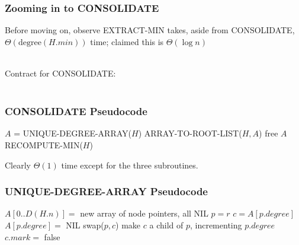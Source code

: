 \documentclass{beamer}
\newcommand{\stanza}{ \\~\ }
\begin{document}
\begin{frame} \frametitle{Zooming in to CONSOLIDATE}
Before moving on, observe EXTRACT-MIN takes, aside from CONSOLIDATE,
$\Theta(\text{degree}(H.min))$ time; claimed this is $\Theta(\log n)$
\stanza

Contract for CONSOLIDATE: \stanza

\begin{algorithmic}[1]
  \EndFunction
\end{algorithmic}
\end{frame}

\begin{frame} \frametitle{CONSOLIDATE Pseudocode}
  \begin{algorithmic}[1]
    \State $A$ = UNIQUE-DEGREE-ARRAY($H$)
    \State ARRAY-TO-ROOT-LIST($H, A$)
    \State free $A$
    \State RECOMPUTE-MIN($H$)
    \EndFunction
  \end{algorithmic}
  \vspace{.5cm}
  Clearly $\Theta(1)$ time except for the three subroutines.
\end{frame}

\begin{frame} \frametitle{UNIQUE-DEGREE-ARRAY Pseudocode}
  {\small
  \begin{algorithmic}[1]
    \State $A[0..D(H.n)] = $ new array of node pointers, all NIL
     
      \State $p = r$ 
       
        \State $c = A[p.degree]$ 
        \State $A[p.degree] = $ NIL 
          \State swap($p, c$) 
        \EndIf
        \State make $c$ a child of $p$, incrementing $p.degree$
        \State $c.mark = $ false
      \EndWhile
    \EndFor
    \State {}
    \EndFunction
  \end{algorithmic}
  }
\end{frame}
\end{document}
